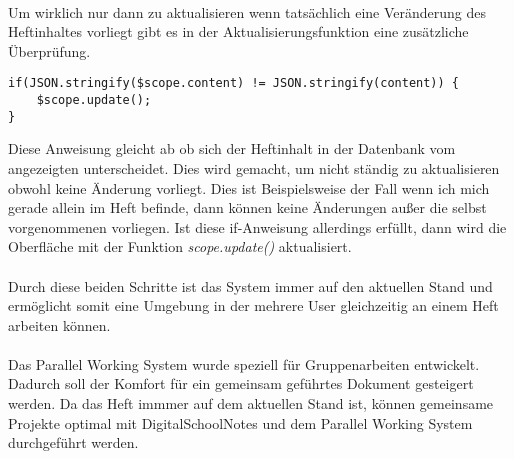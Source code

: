 \\
Um wirklich nur dann zu aktualisieren wenn tatsächlich eine Veränderung des Heftinhaltes vorliegt gibt es in der Aktualisierungsfunktion eine zusätzliche Überprüfung. 
\begin{lstlisting}[caption={Synchronisation - PWS}]
if(JSON.stringify($scope.content) != JSON.stringify(content)) {
	$scope.update();
}
\end{lstlisting}
Diese Anweisung gleicht ab ob sich der Heftinhalt in der Datenbank vom angezeigten unterscheidet. Dies wird gemacht, um nicht ständig zu aktualisieren obwohl keine Änderung vorliegt. Dies ist Beispielsweise der Fall wenn ich mich gerade allein im Heft befinde, dann können keine Änderungen außer die selbst vorgenommenen vorliegen. Ist diese if-Anweisung allerdings erfüllt, dann wird die Oberfläche mit der Funktion \textit{scope.update()} aktualisiert.\\ 
\\
Durch diese beiden Schritte ist das System immer auf den aktuellen Stand und ermöglicht somit eine Umgebung in der mehrere User gleichzeitig an einem Heft arbeiten können.\\
\\
Das Parallel Working System wurde speziell für Gruppenarbeiten entwickelt. Dadurch soll der Komfort für ein gemeinsam geführtes Dokument gesteigert werden. Da das Heft immmer auf dem aktuellen Stand ist, können gemeinsame Projekte optimal mit DigitalSchoolNotes und dem Parallel Working System  durchgeführt werden. 
 
